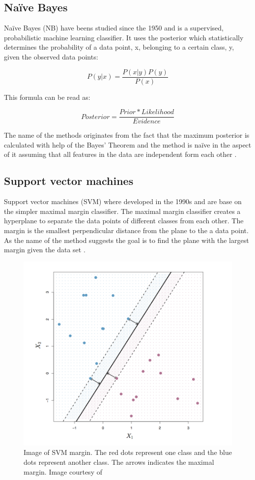 \subsection{Naïve Bayes}

Naïve Bayes (NB) have beens studied since the 1950 and is a supervised, probabilistic machine learning classifier. It uses the  posterior which statistically determines the probability of a data point, x, belonging to a certain class, y, given the observed data points:

\[
P(y|x) = \frac{P(x|y)P(y)}{P(x)}
\]

This formula can be read as:

\[
Posterior = \frac{Prior * Likelihood}{Evidence}
\]

The name of the methods originates from the fact that the maximum posterior is calculated with help of the Bayes' Theorem and the method is naïve in the aspect of it assuming that all features in the data are independent form each other \parencite{george2012}.


\subsection{Support vector machines}

Support vector machines (SVM) where developed in the 1990s and are base on the simpler maximal margin classifier. The maximal margin classifier creates a hyperplane to separate the data points of different classes from each other. The margin is the smallest perpendicular distance from the plane to the a data point. As the name of the method suggests the goal is to find the plane with the largest margin given the data set \textcite{James:2014}.

\begin{figure}[ht!]
  \centering
  \includegraphics[width=0.7\linewidth]{images/Margin_SVM.png}
  \caption{Image of SVM margin. The red dots represent one class and the blue dots represent another class. The arrows indicates the maximal margin. Image courtesy of \textcite{James:2014}}
  \label{fig:SVM_Margin}
\end{figure}

